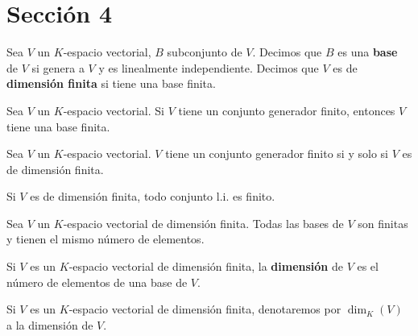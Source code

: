 \section{Sección 4}

\begin{definition}{}{}
    Sea $V$ un $K$-espacio vectorial, $B$ subconjunto de $V$. Decimos que $B$ es una \textbf{base} de $V$ si genera a $V$ y es linealmente independiente. Decimos que $V$ es de \textbf{dimensión finita} si tiene una base finita.
\end{definition}
\begin{proposition}{}{}
    Sea $V$ un $K$-espacio vectorial. Si $V$ tiene un conjunto generador finito, entonces $V$ tiene una base finita.
\end{proposition}
\begin{corollary}{}{}
    Sea $V$ un $K$-espacio vectorial. $V$ tiene un conjunto generador finito si y solo si $V$ es de dimensión finita.
\end{corollary}
\begin{obs}{}{}
    Si $V$ es de dimensión finita, todo conjunto l.i. es finito.
\end{obs}
\begin{theorem}{}{}
    Sea $V$ un $K$-espacio vectorial de dimensión finita. Todas las bases de $V$ son finitas y tienen el mismo número de elementos.
\end{theorem}
\begin{definition}{}{}
    Si $V$ es un $K$-espacio vectorial de dimensión finita, la \textbf{dimensión} de $V$ es el número de elementos de una base de $V$. 
\end{definition}
\begin{notation}{}{}
    Si $V$ es un $K$-espacio vectorial de dimensión finita, denotaremos por $\dim_K(V)$ a la dimensión de $V$.
\end{notation}

